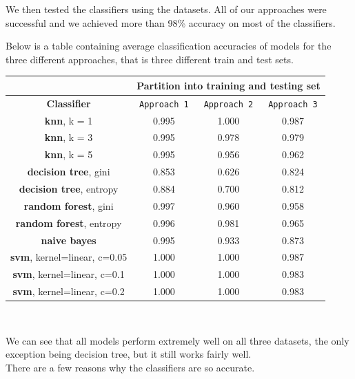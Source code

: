 \documentclass[12pt,a4paper]{article}
\begin{document}
    We then tested the classifiers using the datasets. All of our approaches were successful and we achieved more than 98\% accuracy on most of the classifiers. 

    Below is a table containing average classification accuracies of models for the three different approaches, that is three different train and test sets.

    \begin{center}
        \begin{tabular}{|c|c|c|c|}
            \hline
			 & \multicolumn{3}{c|}{\textbf{Partition into training and testing set}} \\
			\hline 
			\textbf{Classifier} & \texttt{Approach 1} & \texttt{Approach 2} & \texttt{Approach 3} \\
            \hline \hline
            
			\textbf{knn}, \small k = 1 & 0.995 & 1.000 & 0.987 \\
			\textbf{knn}, \small k = 3 & 0.995 & 0.978 & 0.979 \\
			\textbf{knn}, \small k = 5 & 0.995 & 0.956 & 0.962 \\
			\hline \hline
			\textbf{decision tree}, \small gini & 0.853 & 0.626 & 0.824 \\
			\textbf{decision tree}, \small entropy & 0.884 & 0.700 & 0.812 \\
			\hline \hline
			\textbf{random forest}, \small gini & 0.997 & 0.960 & 0.958 \\
			\textbf{random forest}, \small entropy & 0.996 & 0.981 & 0.965 \\
			\hline \hline
			\textbf{naive bayes} & 0.995 & 0.933 & 0.873 \\
			\hline \hline
			\textbf{svm}, \small kernel=linear, c=0.05 & 1.000 & 1.000 & 0.987 \\
			\textbf{svm}, \small kernel=linear, c=0.1 & 1.000 & 1.000 & 0.983 \\
			\textbf{svm}, \small kernel=linear, c=0.2 & 1.000 & 1.000 & 0.983 \\
			\hline
		\end{tabular} \\
    \end{center}

    We can see that all models perform extremely well on all three datasets, the only exception being decision tree, but it still works fairly well. \\

    There are a few reasons why the classifiers are so accurate.
\end{document}

